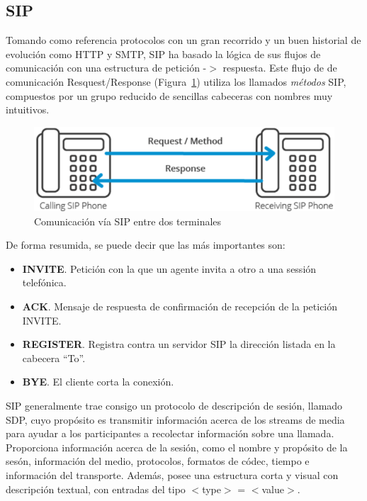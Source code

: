 \documentclass[a4paper, 12pt]{book}
\begin{document}
\subsection{SIP}
\label{sec:sip}
Tomando como referencia protocolos con un gran recorrido y un buen historial de evolución como HTTP y SMTP, SIP ha basado la lógica de sus flujos de comunicación con una estructura de petición -$>$ respuesta. Este flujo de de comunicación Resquest/Response (Figura~\ref{figura:fig_phones}) utiliza los llamados \emph{métodos} SIP, compuestos por un grupo reducido de sencillas cabeceras con nombres muy intuitivos.

\begin{figure}[h]
  \centering
  \includegraphics{img/fig_phones}
  \caption{Comunicación vía SIP entre dos terminales}
  \label{figura:fig_phones}
\end{figure}

De forma resumida, se puede decir que las más importantes son:
\begin{itemize}
  \item \textbf{INVITE}. Petición con la que un agente invita a otro a una sessión telefónica.
  \item \textbf{ACK}. Mensaje de respuesta de confirmación de recepción de la petición INVITE.
  \item \textbf{REGISTER}. Registra contra un servidor SIP la dirección listada en la cabecera ``To''.
  \item \textbf{BYE}. El cliente corta la conexión.\\
\end{itemize}

SIP generalmente trae consigo un protocolo de descripción de sesión, llamado SDP, cuyo propósito es transmitir información acerca de los streams de media para ayudar a los participantes a recolectar información sobre una llamada. Proporciona información acerca de la sesión, como el nombre y propósito de la sesón, información del medio, protocolos, formatos de códec, tiempo e información del transporte. Además, posee una estructura corta y visual con descripción textual, con entradas del tipo $<$type$>$ = $<$value$>$.
\end{document}
